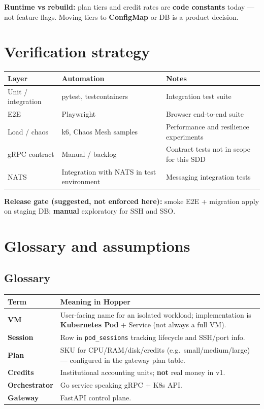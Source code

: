 \documentclass[12pt,a4paper]{article}
\begin{document}
\vspace{0.5em}
\noindent\textbf{Runtime vs rebuild:} plan tiers and credit rates are \textbf{code constants} today --- not feature flags. Moving tiers to \textbf{ConfigMap} or DB is a product decision.

\section{Verification strategy}
\label{app:verification}

\begin{tabularx}{\textwidth}{@{}L{3.2cm} L{3.5cm} X@{}}
  \toprule
  \textbf{Layer} & \textbf{Automation} & \textbf{Notes} \\
  \midrule
  Unit / integration & pytest, testcontainers & Integration test suite \\
  E2E & Playwright & Browser end-to-end suite \\
  Load / chaos & k6, Chaos Mesh samples & Performance and resilience experiments \\
  gRPC contract & Manual / backlog & Contract tests not in scope for this SDD \\
  NATS & Integration with NATS in test environment & Messaging integration tests \\
  \bottomrule
\end{tabularx}

\vspace{0.5em}
\noindent\textbf{Release gate (suggested, not enforced here):} smoke E2E + migration apply on staging DB; \textbf{manual} exploratory for SSH and SSO.

\section{Glossary and assumptions}
\label{app:glossary}

\subsection{Glossary}
\begin{tabularx}{\textwidth}{@{}L{3.2cm} X@{}}
  \toprule
  \textbf{Term} & \textbf{Meaning in Hopper} \\
  \midrule
  \textbf{VM} & User-facing name for an isolated workload; implementation is \textbf{Kubernetes Pod} + Service (not always a full VM). \\
  \textbf{Session} & Row in \texttt{pod\_sessions} tracking lifecycle and SSH/port info. \\
  \textbf{Plan} & SKU for CPU/RAM/disk/credits (e.g.\ small/medium/large) --- configured in the gateway plan table. \\
  \textbf{Credits} & Institutional accounting units; \textbf{not} real money in v1. \\
  \textbf{Orchestrator} & Go service speaking gRPC + K8s API. \\
  \textbf{Gateway} & FastAPI control plane. \\
  \bottomrule
\end{tabularx}
\end{document}
